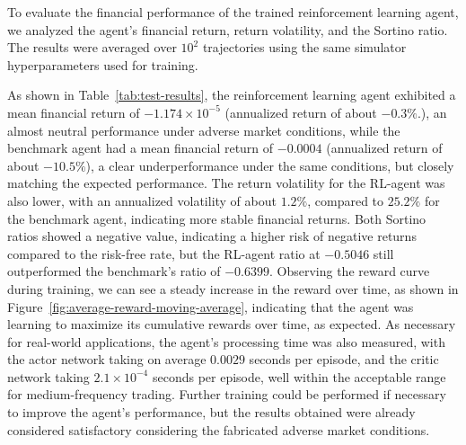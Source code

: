 



To evaluate the financial performance of the trained reinforcement learning agent, we analyzed the agent's
financial return, return volatility, and the Sortino ratio.
The results were averaged over $10^2$ trajectories using the same simulator hyperparameters used for training.

As shown in Table~\ref{tab:test-results}, the reinforcement learning agent exhibited a mean financial return of $-1.174 \times 10^{-5}$
(annualized return of about $-0.3\%$.), an almost neutral performance under adverse market conditions,
while the benchmark agent had a mean financial return of $-0.0004$ (annualized return of about $-10.5\%$),
a clear underperformance under the same conditions, but closely matching the expected performance.
The return volatility for the RL-agent was also lower, with an annualized volatility of about $1.2\%$,
compared to $25.2\%$ for the benchmark agent, indicating more stable financial returns.
Both Sortino ratios showed a negative value, indicating a higher risk of negative returns compared to the risk-free rate,
but the RL-agent ratio at $-0.5046$ still outperformed the benchmark's ratio of $-0.6399$.
Observing the reward curve during training, we can see a steady increase in the reward over time, as shown in Figure~\ref{fig:average-reward-moving-average},
indicating that the agent was learning to maximize its cumulative rewards over time, as expected.
As necessary for real-world applications, the agent's processing time was also measured, with the actor network taking on average $0.0029$ seconds per episode,
and the critic network taking $2.1 \times 10^{-4}$ seconds per episode, well within the acceptable range for medium-frequency trading.
Further training could be performed if necessary to improve the agent's performance, but the results obtained were already considered satisfactory
considering the fabricated adverse market conditions.

